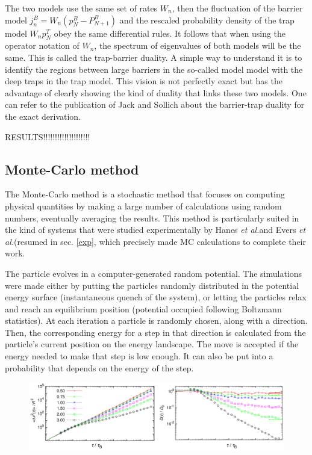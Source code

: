 \documentclass[a4paper,12pt]{article}
\newcommand{\jline}{\vspace{10pt}}
\newcommand{\etal}{\textit{et al.}}
\begin{document}
The two models use the same set of rates $W_n$, then the fluctuation of the barrier model $j_n^B=W_n\left(p_N^B-P_{N+1}^B\right)$ and the rescaled probability density of the trap model $W_n p_N^T$ obey the same differential rules. It follows that when using the operator notation of $W_n$, the spectrum of eigenvalues of both models will be the same. This is called the trap-barrier duality. A simple way to understand it is to identify the regions between large barriers in the so-called model model with the deep traps in the trap model. This vision is not perfectly exact but has the advantage of clearly showing the kind of duality that links these two models. One can refer to the publication of Jack and Sollich about the barrier-trap duality \cite{Jack2007} for the exact derivation.\jline

RESULTS!!!!!!!!!!!!!!!!!!!!

\subsection{Monte-Carlo method}
\label{monte-carlo}

The Monte-Carlo method is a stochastic method that focuses on computing physical quantities by making a large number of calculations using random numbers, eventually averaging the results. This method is particularly suited in the kind of systems that were studied experimentally by Hanes \etal and Evers \etal (resumed in sec. \ref{exp}, which precisely made MC calculations to complete their work.\jline

The particle evolves in a computer-generated random potential. The simulations were made either by putting the particles randomly distributed in the potential energy surface (instantaneous quench of the system), or letting the particles relax and reach an equilibrium position (potential occupied following Boltzmann statistics). At each iteration a particle is randomly chosen, along with a direction. Then, the corresponding energy for a step in that direction is calculated from the particle's current position on the energy landscape. The move is accepted if the energy needed to make that step is low enough. It can also be put into a probability that depends on the energy of the step.\jline

\begin{figure}[htbp]
\centering
\subfigure
{\includegraphics[width=14cm]{pics/msd_ndc_mc.png}}
\caption{}
\label{msd ndc mc}
\end{figure}
\end{document}
